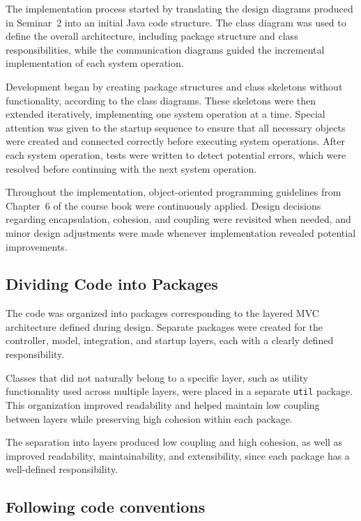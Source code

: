 \documentclass[a4paper]{scrartcl}
\begin{document}
The implementation process started by translating the design diagrams produced in Seminar~2 into an initial Java code structure. The class diagram was used to define the overall architecture, including package structure and class responsibilities, while the communication diagrams guided the incremental implementation of each system operation.

Development began by creating package structures and class skeletons without functionality, according to the class diagrams. These skeletons were then extended iteratively, implementing one system operation at a time. Special attention was given to the startup sequence to ensure that all necessary objects were created and connected correctly before executing system operations. After each system operation, tests were written to detect potential errors, which were resolved before continuing with the next system operation.

Throughout the implementation, object-oriented programming guidelines from Chapter~6 of
the course book were continuously applied. Design decisions regarding encapsulation,
cohesion, and coupling were revisited when needed, and minor design adjustments were made
whenever implementation revealed potential improvements.

\subsection{Dividing Code into Packages}

The code was organized into packages corresponding to the layered MVC architecture defined
during design. Separate packages were created for the controller, model, integration, and
startup layers, each with a clearly defined responsibility.

Classes that did not naturally belong to a specific layer, such as utility functionality
used across multiple layers, were placed in a separate \texttt{util} package. This
organization improved readability and helped maintain low coupling between layers while
preserving high cohesion within each package.

The separation into layers produced low coupling and high cohesion, as well as improved readability, maintainability, and extensibility, since each package has a well-defined responsibility.

\subsection{Following code conventions}
\end{document}
